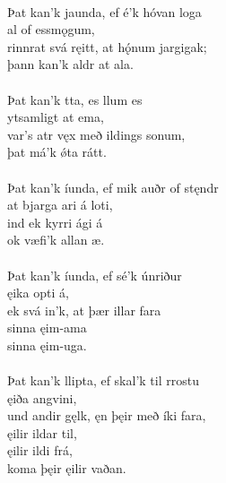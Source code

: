  \\

\bva Þat kan'k jaunda, \hld ef é'k hóvan loga \\%
\ind {}al of essmǫgum, \\%
rinnrat svá ręitt, \hld at hǫ́num jargigak; \\%
\ind þann kan'k aldr at ala.\\%

 \\

\bva Þat kan'k tta, \hld es llum es \\%
\ind {}ytsamligt at ema, \\%
var's atr vęx \hld með ildings sonum, \\%
\ind þat má'k ǿta rátt.\\%

 \\

\bva Þat kan'k íunda, \hld ef mik auðr of stęndr \\%
\ind at bjarga ari á loti, \\%
ind ek kyrri \hld {}ági á \\%
\ind ok væfi'k allan æ.\\%

 \\

\bva Þat kan'k íunda, \hld ef sé'k únriður \\%
\ind {}ęika opti á, \\%
ek svá in'k, \hld at þær illar fara \\%
\ind sinna ęim-ama \\%
\ind sinna ęim-uga.\\%

 \\

\bva Þat kan'k llipta, \hld ef skal'k til rrostu \\%
\ind {}ęiða angvini, \\%
und andir gęlk, \hld ęn þęir með íki fara, \\%
\ind {}ęilir ildar til, \\%
\ind {}ęilir ildi frá, \\%
\ind koma þęir ęilir vaðan.\\%

